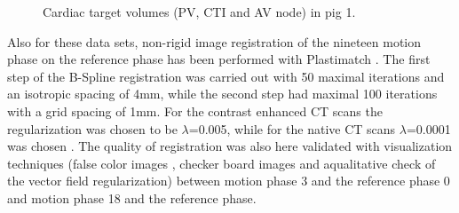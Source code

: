 \documentclass[type=dr, dr=rernat, accentcolor=tud7b,colorbacktitle, bigchapter, openright, twoside, 12pt ]{tudthesis}
\begin{document}
\newpage

 \begin{figure}[H]
 \begin{center}
\caption{Cardiac target volumes (PV, CTI and AV node) in pig 1. }
\label{pig1_targets}
 \end{center}
\end{figure}

\vspace*{-0.7cm}

Also for these data sets, non-rigid image registration of the nineteen motion phase on the reference phase has been performed with Plastimatch 
\cite{Sharp07} \cite{Shack10}. The first step of the B-Spline registration was carried out with 50 maximal iterations and an isotropic 
spacing of 4mm, while the second step had maximal 100 iterations with a grid spacing of 1mm. For the contrast enhanced CT scans the 
regularization was chosen to be $\lambda$=0.005, while for the native CT scans $\lambda$=0.0001 was chosen . 
The quality of registration was also here validated with visualization techniques (false color images \cite{Bro07}, checker board images 
\cite{Bro07} and aqualitative check of the vector field regularization) between motion phase 3 and the reference phase 0 and motion 
phase 18 and the reference phase.  
\end{document}
